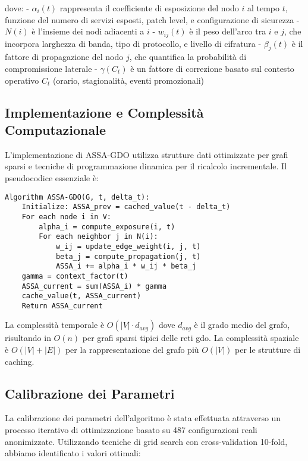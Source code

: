 dove:
- $\alpha_i(t)$ rappresenta il coefficiente di esposizione del nodo $i$ al tempo $t$, funzione del numero di servizi esposti, patch level, e configurazione di sicurezza
- $N(i)$ è l'insieme dei nodi adiacenti a $i$
- $w_{ij}(t)$ è il peso dell'arco tra $i$ e $j$, che incorpora larghezza di banda, tipo di protocollo, e livello di cifratura
- $\beta_j(t)$ è il fattore di propagazione del nodo $j$, che quantifica la probabilità di compromissione laterale
- $\gamma(C_t)$ è un fattore di correzione basato sul contesto operativo $C_t$ (orario, stagionalità, eventi promozionali)

\subsection{\texorpdfstring{Implementazione e Complessità Computazionale}{2.4.2 - Implementazione e Complessità Computazionale}}

L'implementazione di ASSA-GDO utilizza strutture dati ottimizzate per grafi sparsi e tecniche di programmazione dinamica per il ricalcolo incrementale. Il pseudocodice essenziale è:

\begin{verbatim}
Algorithm ASSA-GDO(G, t, delta_t):
    Initialize: ASSA_prev = cached_value(t - delta_t)
    For each node i in V:
        alpha_i = compute_exposure(i, t)
        For each neighbor j in N(i):
            w_ij = update_edge_weight(i, j, t)
            beta_j = compute_propagation(j, t)
            ASSA_i += alpha_i * w_ij * beta_j
    gamma = context_factor(t)
    ASSA_current = sum(ASSA_i) * gamma
    cache_value(t, ASSA_current)
    Return ASSA_current
\end{verbatim}

La complessità temporale è $O(|V| \cdot d_{avg})$ dove $d_{avg}$ è il grado medio del grafo, risultando in $O(n)$ per grafi sparsi tipici delle reti \gls{gdo}. La complessità spaziale è $O(|V| + |E|)$ per la rappresentazione del grafo più $O(|V|)$ per le strutture di caching.

\subsection{\texorpdfstring{Calibrazione dei Parametri}{2.4.3 - Calibrazione dei Parametri}}

La calibrazione dei parametri dell'algoritmo è stata effettuata attraverso un processo iterativo di ottimizzazione basato su 487 configurazioni reali anonimizzate. Utilizzando tecniche di grid search con cross-validation 10-fold, abbiamo identificato i valori ottimali:

